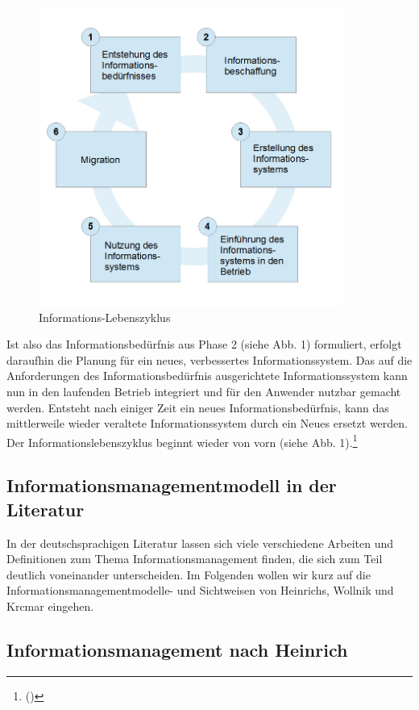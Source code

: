 \begin{figure}[h!]
	\centering
	\includegraphics[width=10cm]{kapitel/gruppe1_1/bilder/informations-lebenszyklus}
	\caption{Informations-Lebenszyklus}
	\label{fig_informations_lebenszyklus}
\end{figure}

Ist also das Informationsbedürfnis aus Phase 2 (siehe Abb. 1) formuliert, erfolgt daraufhin die Planung für ein neues, verbessertes Informationssystem. Das auf die Anforderungen des Informationsbedürfnis ausgerichtete Informationssystem kann nun in den laufenden Betrieb integriert und für den Anwender nutzbar gemacht werden. Entsteht nach einiger Zeit ein neues Informationsbedürfnis, kann das mittlerweile wieder veraltete Informationssystem durch ein Neues ersetzt werden. Der Informationslebenszyklus beginnt wieder von vorn (siehe Abb. 1).\footnote{(\cite{dippold_datenmanagement_2005})}

\subsection{Informationsmanagementmodell in der Literatur}
In der deutschsprachigen Literatur lassen sich viele verschiedene Arbeiten und Definitionen zum Thema Informationsmanagement finden, die sich zum Teil deutlich voneinander unterscheiden. Im Folgenden wollen wir kurz auf die Informationsmanagementmodelle- und Sichtweisen von Heinrichs, Wollnik und Krcmar eingehen.

\subsection{Informationsmanagement nach Heinrich}


